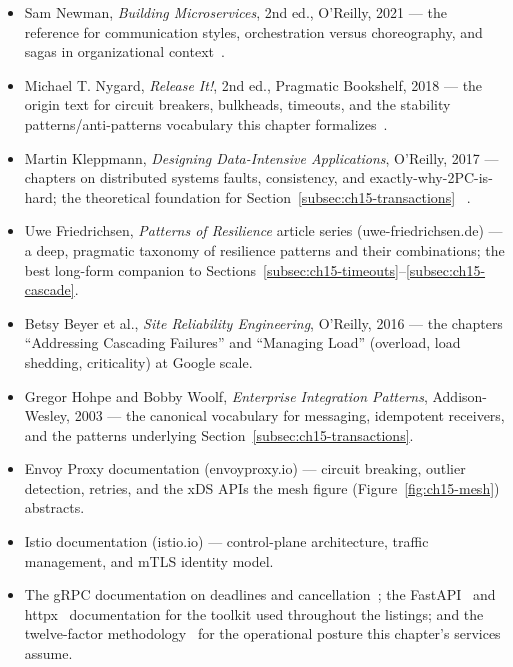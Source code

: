 \begin{itemize}
  \item Sam Newman, \emph{Building Microservices}, 2nd ed., O'Reilly, 2021
        --- the reference for communication styles, orchestration versus
        choreography, and sagas in organizational
        context~\cite{newman2021microservices}.
  \item Michael T. Nygard, \emph{Release It!}, 2nd ed., Pragmatic
        Bookshelf, 2018 --- the origin text for circuit breakers,
        bulkheads, timeouts, and the stability
        patterns/anti-patterns vocabulary this chapter
        formalizes~\cite{nygard2018releaseit}.
  \item Martin Kleppmann, \emph{Designing Data-Intensive Applications},
        O'Reilly, 2017 --- chapters on distributed systems faults,
        consistency, and exactly-why-2PC-is-hard; the theoretical
        foundation for Section~\ref{subsec:ch15-transactions}
        ~\cite{kleppmann2017ddia}.
  \item Uwe Friedrichsen, \emph{Patterns of Resilience} article series
        (uwe-friedrichsen.de) --- a deep, pragmatic taxonomy of resilience
        patterns and their combinations; the best long-form companion to
        Sections~\ref{subsec:ch15-timeouts}--\ref{subsec:ch15-cascade}.
  \item Betsy Beyer et al., \emph{Site Reliability Engineering}, O'Reilly,
        2016 --- the chapters ``Addressing Cascading Failures'' and
        ``Managing Load'' (overload, load shedding, criticality) at Google
        scale.
  \item Gregor Hohpe and Bobby Woolf, \emph{Enterprise Integration
        Patterns}, Addison-Wesley, 2003 --- the canonical vocabulary for
        messaging, idempotent receivers, and the patterns underlying
        Section~\ref{subsec:ch15-transactions}.
  \item Envoy Proxy documentation (envoyproxy.io) --- circuit breaking,
        outlier detection, retries, and the xDS APIs the mesh figure
        (Figure~\ref{fig:ch15-mesh}) abstracts.
  \item Istio documentation (istio.io) --- control-plane architecture,
        traffic management, and mTLS identity model.
  \item The gRPC documentation on deadlines and
        cancellation~\cite{grpcdocs}; the FastAPI~\cite{fastapidocs} and
        httpx~\cite{httpxdocs} documentation for the toolkit used
        throughout the listings; and the twelve-factor
        methodology~\cite{twelvefactor} for the operational posture this
        chapter's services assume.
\end{itemize}

